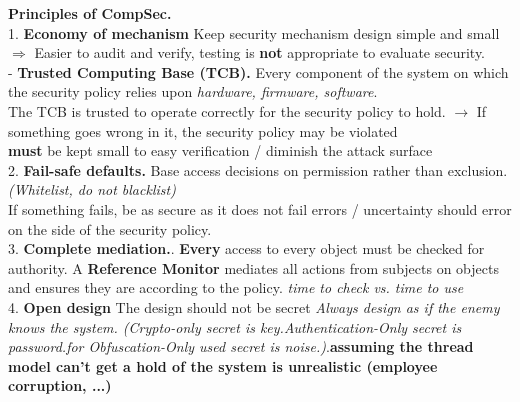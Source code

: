 \documentclass[9pt, a4paper]{extarticle}
\let\oldwarning\warning
\renewcommand{\warning}{\raisebox{0.3ex}{\oldwarning}}
\begin{document}
\noindent \begin{minipage}[t]{0.495\textwidth}
	\noindent \textbf{Principles of CompSec.}\\
	1. \textbf{Economy of mechanism}
	Keep security mechanism design simple and small $\Rightarrow$ Easier to audit and verify, testing is \textbf{not} appropriate to evaluate security.\\
	\noindent - \textbf{Trusted Computing Base (TCB).} Every component of the system on which the security policy relies upon \textit{hardware, firmware, software}. \\The TCB is trusted to operate correctly for the security policy to hold. $\to$ If something goes wrong in it, the security policy may be violated\\
	\textbf{must} be kept small to easy verification / diminish the attack surface\\
	2. \textbf{Fail-safe defaults.} Base access decisions on permission rather than exclusion. \textit{(Whitelist, do not blacklist)} \\
	If something fails, be as secure as it does not fail errors / uncertainty should error on the side of the security policy.\\
	3. \textbf{Complete mediation.}. \textbf{Every} access to every object must be checked for authority. A \textbf{Reference Monitor} mediates all actions from subjects on objects and ensures they are according to the policy. \textit{\warning time to check vs. time to use}\\
	4. \textbf{Open design} The design should not be secret \textit{Always design as if the enemy knows the system. (Crypto-only secret is key.Authentication-Only secret is password.for Obfuscation-Only used secret is noise.)}.\textbf{assuming the thread model can't get a hold of the system is unrealistic (employee corruption, ...)}
\end{minipage}
\hfill
\end{document}

